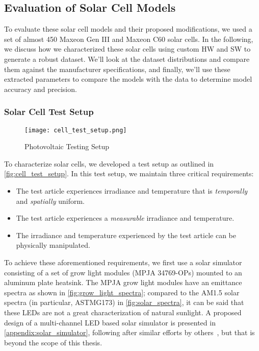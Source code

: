 \subsection{Evaluation of Solar Cell Models}\label{subsec:eval_solar_cell_models}

To evaluate these solar cell models and their proposed modifications, we used a
set of almost 450 Maxeon Gen III and Maxeon C60 solar cells. In the following,
we discuss how we characterized these solar cells using custom \acf{HW} and
\acf{SW} to generate a robust dataset. We'll look at the dataset distributions
and compare them against the manufacturer specifications, and finally, we'll use
these extracted parameters to compare the models with the data to determine
model accuracy and precision.


\subsubsection{Solar Cell Test Setup}\label{subsubsec:solar_cell_test_setup}

\begin{figure}[!htbp]
    \texttt{[image: cell\_test\_setup.png]}
    \caption{Photovoltaic Testing Setup}
    \label{fig:cell_test_setup}
\end{figure}

To characterize solar cells, we developed a test setup as outlined in
\autoref{fig:cell_test_setup}. In this test setup, we maintain three critical
requirements:

\begin{itemize}
    \item The test article experiences irradiance and temperature that is
    \textit{temporally} and \textit{spatially} uniform.
    \item The test article experiences a \textit{measurable} irradiance and
    temperature.
    \item The irradiance and temperature experienced by the test article can be
    physically manipulated.
\end{itemize}

To achieve these aforementioned requirements, we first use a solar simulator
consisting of a set of grow light modules (MPJA 34769-OPs) mounted to an
aluminum plate heatsink. The MPJA grow light modules have an emittance
spectra as shown in \autoref{fig:grow_light_spectra}; compared to the AM1.5
solar spectra (in particular, ASTMG173) in \autoref{fig:solar_spectra}, it can
be said that these LEDs are not a great characterization of natural sunlight.
A proposed design of a multi-channel LED based solar simulator is presented in
\autoref{appendix:solar_simulator}, following after similar efforts by
others~\cites{lopez_fraguas_et_al,plyta_et_al,al_ahmad_et_al,naskari_et_al},
but that is beyond the scope of this thesis.

